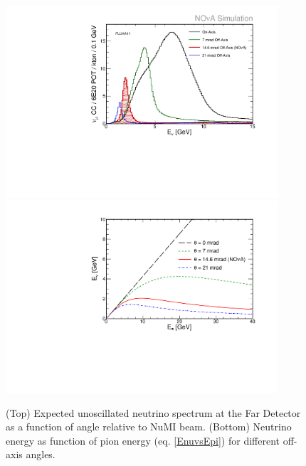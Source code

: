 \begin{figure}
\includegraphics[width=0.9\textwidth]{figures/FD_NOvA_OffAxis_Spectra.pdf}\\%
\includegraphics[width=0.9\textwidth]{figures/EnuVSEpi_NOvA.pdf}
\centering
\caption{(Top) Expected unoscillated neutrino spectrum at the Far Detector as a function of 
angle relative to NuMI beam. (Bottom) Neutrino energy as function of pion energy (eq. \ref{EnuvsEpi}) 
for different off-axis angles.} \label{fig:Spec}
\end{figure}

